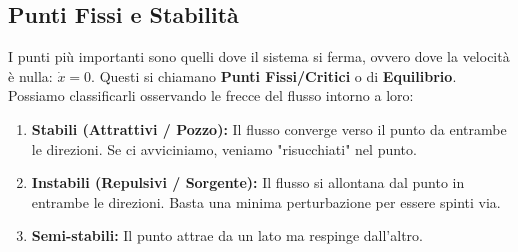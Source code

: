 \documentclass[openany]{book}
\theoremstyle{definition}
\theoremstyle{remark}
\begin{document}
\subsection{Punti Fissi e Stabilità}

I punti più importanti sono quelli dove il sistema si ferma, ovvero dove la velocità è nulla: $\dot{x} = 0$. Questi si chiamano \textbf{Punti Fissi/Critici} o di \textbf{Equilibrio}.
Possiamo classificarli osservando le frecce del flusso intorno a loro:

\begin{enumerate}
    \item \textbf{Stabili (Attrattivi / Pozzo):} Il flusso converge verso il punto da entrambe le direzioni. Se ci avviciniamo, veniamo "risucchiati" nel punto.
    \begin{center}
    \end{center}
    
    \item \textbf{Instabili (Repulsivi / Sorgente):} Il flusso si allontana dal punto in entrambe le direzioni. Basta una minima perturbazione per essere spinti via.
    \begin{center}
    \end{center}
    
    \item \textbf{Semi-stabili:} Il punto attrae da un lato ma respinge dall'altro.
    \begin{center}
    \end{center}
\end{enumerate}
\end{document}
